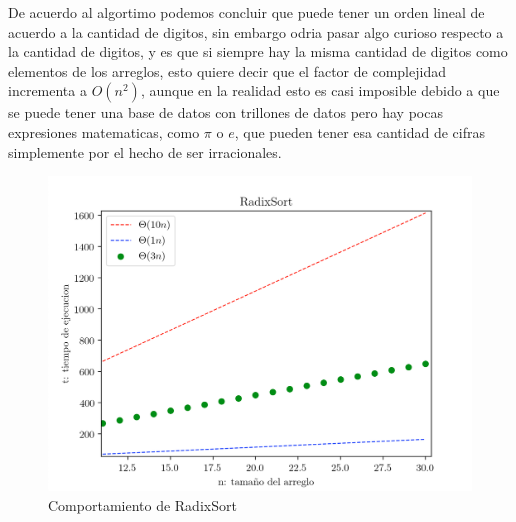 \documentclass[12pt,twoside]{article}
\begin{document}
De acuerdo al algortimo podemos concluir que puede tener un orden lineal de acuerdo a la cantidad de digitos, sin embargo odria pasar algo curioso
respecto a la cantidad de digitos, y es que si siempre hay la misma cantidad de digitos como elementos de los arreglos, esto quiere decir que el factor
de complejidad incrementa a $O(n^2)$, aunque en la realidad esto es casi imposible debido a que se puede tener una base de datos con trillones de datos
pero hay pocas expresiones matematicas, como $\pi$ o $e$, que pueden tener esa cantidad de cifras simplemente por el hecho de ser irracionales.

\begin{figure}
  \centering
    \includegraphics[height=0.75\textwidth]{Figure5}
  \caption{Comportamiento de RadixSort}
  \label{fig:ejemplo3}
\end{figure}
\end{document}

